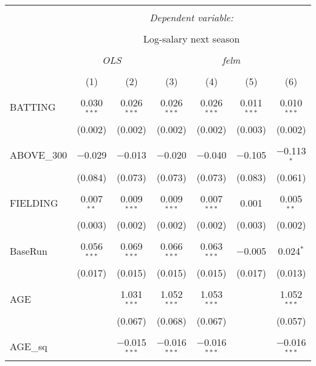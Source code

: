 
\begin{table}[!htbp] \centering
  \caption{}
  \label{}
  \scriptsize
\begin{tabular}{@{\extracolsep{5pt}}lcccccc}
\\[-1.8ex]\hline
\hline \\[-1.8ex]
 & \multicolumn{6}{c}{\textit{Dependent variable:}} \\
\cline{2-7}
\\[-1.8ex] & \multicolumn{6}{c}{Log-salary next season} \\
\\[-1.8ex] & \multicolumn{2}{c}{\textit{OLS}} & \multicolumn{4}{c}{\textit{felm}} \\
\\[-1.8ex] & (1) & (2) & (3) & (4) & (5) & (6)\\
\hline \\[-1.8ex]
 BATTING & 0.030$^{***}$ & 0.026$^{***}$ & 0.026$^{***}$ & 0.026$^{***}$ & 0.011$^{***}$ & 0.010$^{***}$ \\
  & (0.002) & (0.002) & (0.002) & (0.002) & (0.003) & (0.002) \\
  & & & & & & \\
 ABOVE\_300 & $-$0.029 & $-$0.013 & $-$0.020 & $-$0.040 & $-$0.105 & $-$0.113$^{*}$ \\
  & (0.084) & (0.073) & (0.073) & (0.073) & (0.083) & (0.061) \\
  & & & & & & \\
 FIELDING & 0.007$^{**}$ & 0.009$^{***}$ & 0.009$^{***}$ & 0.007$^{***}$ & 0.001 & 0.005$^{**}$ \\
  & (0.003) & (0.002) & (0.002) & (0.002) & (0.003) & (0.002) \\
  & & & & & & \\
 BaseRun & 0.056$^{***}$ & 0.069$^{***}$ & 0.066$^{***}$ & 0.063$^{***}$ & $-$0.005 & 0.024$^{*}$ \\
  & (0.017) & (0.015) & (0.015) & (0.015) & (0.017) & (0.013) \\
  & & & & & & \\
 AGE &  & 1.031$^{***}$ & 1.052$^{***}$ & 1.053$^{***}$ &  & 1.052$^{***}$ \\
  &  & (0.067) & (0.068) & (0.067) &  & (0.057) \\
  & & & & & & \\
 AGE\_sq &  & $-$0.015$^{***}$ & $-$0.016$^{***}$ & $-$0.016$^{***}$ &  & $-$0.016$^{***}$ \\

\end{tabular}
\end{table}
